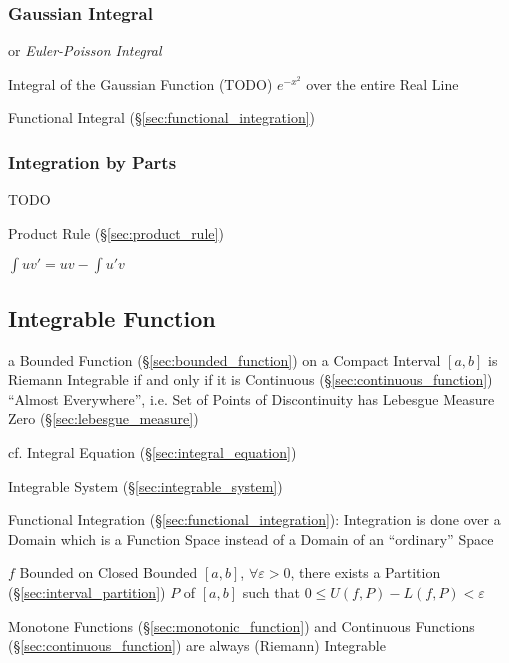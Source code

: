 \subsubsection{Gaussian Integral}\label{sec:gaussian_integral}

or \emph{Euler-Poisson Integral}

Integral of the Gaussian Function (TODO) $e^{-x^2}$ over the entire Real Line

\fist Functional Integral (\S\ref{sec:functional_integration})



\subsubsection{Integration by Parts}\label{sec:integration_by_parts}

TODO

\fist Product Rule (\S\ref{sec:product_rule})

$\int{uv'} = uv - \int{u'v}$



\subsection{Integrable Function}\label{sec:integrable_function}


a Bounded Function (\S\ref{sec:bounded_function}) on a Compact Interval $[a,b]$
is Riemann Integrable if and only if it is Continuous
(\S\ref{sec:continuous_function}) ``Almost Everywhere'', i.e. Set of Points of
Discontinuity has Lebesgue Measure Zero (\S\ref{sec:lebesgue_measure})

cf. Integral Equation (\S\ref{sec:integral_equation})

\fist Integrable System (\S\ref{sec:integrable_system})

\fist Functional Integration (\S\ref{sec:functional_integration}): Integration
is done over a Domain which is a Function Space instead of a Domain of an
``ordinary'' Space

$f$ Bounded on Closed Bounded $[a,b]$, $\forall \varepsilon >0$, there
exists a Partition (\S\ref{sec:interval_partition}) $P$ of $[a,b]$
such that $0 \leq U(f,P) - L(f,P) < \varepsilon$ %

Monotone Functions (\S\ref{sec:monotonic_function}) and Continuous
Functions (\S\ref{sec:continuous_function}) are always (Riemann)
Integrable

